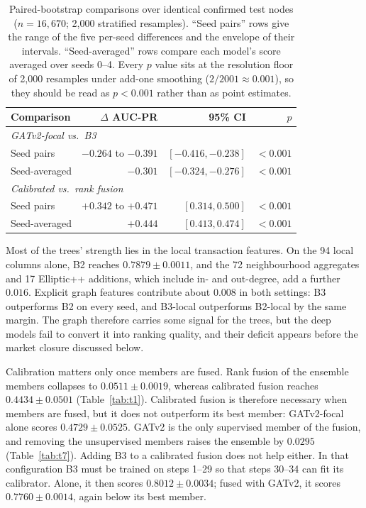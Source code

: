 \documentclass[conference]{IEEEtran}
\begin{document}
\begin{table}[t]
\caption{Paired-bootstrap comparisons over identical confirmed test nodes
($n = 16{,}670$; 2,000 stratified resamples). ``Seed pairs'' rows give the
range of the five per-seed differences and the envelope of their intervals.
``Seed-averaged'' rows compare each model's score averaged over seeds 0--4.
Every $p$ value sits at the resolution floor of 2,000 resamples under add-one
smoothing ($2/2001 \approx 0.001$), so they should be read as $p < 0.001$
rather than as point estimates.}
\label{tab:t3}
\centering
\footnotesize
\setlength{\tabcolsep}{3pt}
\begin{tabular}{lrrr}
\toprule
Comparison & $\Delta$ AUC-PR & 95\% CI & $p$ \\
\midrule
\multicolumn{4}{l}{\textit{GATv2-focal vs.\ B3}} \\
\quad Seed pairs & $-0.264$ to $-0.391$ & $[-0.416, -0.238]$ & $<0.001$ \\
\quad Seed-averaged & $-0.301$ & $[-0.324, -0.276]$ & $<0.001$ \\
\multicolumn{4}{l}{\textit{Calibrated vs.\ rank fusion}} \\
\quad Seed pairs & $+0.342$ to $+0.471$ & $[0.314, 0.500]$ & $<0.001$ \\
\quad Seed-averaged & $+0.444$ & $[0.413, 0.474]$ & $<0.001$ \\
\bottomrule
\end{tabular}
\end{table}

Most of the trees' strength lies in the local transaction features. On the 94
local columns alone, B2 reaches $0.7879 \pm 0.0011$, and the 72 neighbourhood
aggregates and 17 Elliptic++ additions, which include in- and out-degree, add a
further $0.016$. Explicit graph features contribute about $0.008$ in both
settings: B3 outperforms B2 on every seed, and B3-local outperforms B2-local by
the same margin. The graph therefore carries some signal for the trees, but the
deep models fail to convert it into ranking quality, and their deficit appears
before the market closure discussed below.

Calibration matters only once members are fused. Rank fusion of the ensemble
members collapses to $0.0511 \pm 0.0019$, whereas calibrated fusion reaches
$0.4434 \pm 0.0501$ (Table~\ref{tab:t1}). Calibrated fusion is therefore
necessary when members are fused, but it does not outperform its best member:
GATv2-focal alone scores $0.4729 \pm 0.0525$. GATv2 is the only supervised
member of the fusion, and removing the unsupervised members raises the ensemble
by $0.0295$ (Table~\ref{tab:t7}). Adding B3 to a calibrated fusion does not help
either. In that configuration B3 must be trained on steps 1--29 so that steps 30--34
can fit its calibrator. Alone, it then scores $0.8012 \pm 0.0034$; fused with
GATv2, it scores $0.7760 \pm 0.0014$, again below its best member.
\end{document}
